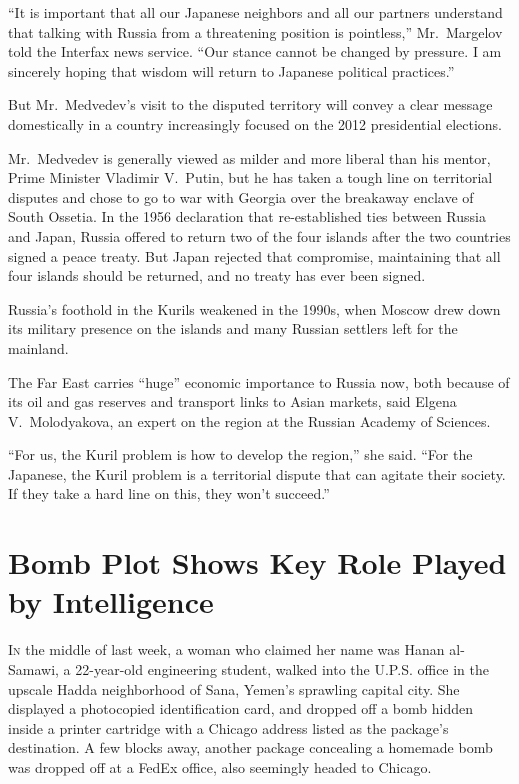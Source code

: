 ﻿\documentclass[12pt]{article}
\begin{document}
``It is important that all our Japanese neighbors and all our partners understand that talking with
Russia from a threatening position is pointless,'' Mr.~Margelov told the Interfax news service.
``Our stance cannot be changed by pressure. I am sincerely hoping that wisdom will return to
Japanese political practices.''

But Mr.~Medvedev's visit to the disputed territory will convey a clear message domestically in a
country increasingly focused on the 2012 presidential elections.

Mr.~Medvedev is generally viewed as milder and more liberal than his mentor, Prime Minister Vladimir
V.~Putin, but he has taken a tough line on territorial disputes and chose to go to war with Georgia
over the breakaway enclave of South Ossetia. In the 1956 declaration that re-established ties
between Russia and Japan, Russia offered to return two of the four islands after the two countries
signed a peace treaty. But Japan rejected that compromise, maintaining that all four islands should
be returned, and no treaty has ever been signed.

Russia's foothold in the Kurils weakened in the 1990s, when Moscow drew down its military presence
on the islands and many Russian settlers left for the mainland.

The Far East carries ``huge'' economic importance to Russia now, both because of its oil and gas
reserves and transport links to Asian markets, said Elgena V.~Molodyakova, an expert on the region
at the Russian Academy of Sciences.

``For us, the Kuril problem is how to develop the region,'' she said. ``For the Japanese, the Kuril
problem is a territorial dispute that can agitate their society. If they take a hard line on this,
they won't succeed.''

\section{Bomb Plot Shows Key Role Played by Intelligence}

\lettrine{I}{n} the middle of last week, a woman who claimed her name was
Hanan al-Samawi, a 22-year-old engineering student, walked into the U.P.S. office in the upscale
Hadda neighborhood of Sana, Yemen's sprawling capital city. She displayed a photocopied
identification card, and dropped off a bomb hidden inside a printer cartridge with a Chicago address
listed as the package's destination. A few blocks away, another package concealing a homemade bomb
was dropped off at a FedEx office, also seemingly headed to Chicago.
\end{document}
